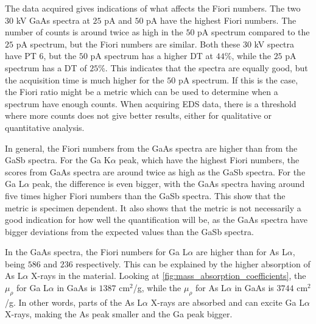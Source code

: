 The data acquired gives indications of what affects the Fiori numbers.
The two $30$ kV GaAs spectra at $25$ pA and $50$ pA have the highest Fiori numbers.
The number of counts is around twice as high in the $50$ pA spectrum compared to the $25$ pA spectrum, but the Fiori numbers are similar.
Both these $30$ kV spectra have PT $6$, but the $50$ pA spectrum has a higher DT at $44$\%, while the $25$ pA spectrum has a DT of $25$\%.
This indicates that the spectra are equally good, but the acquisition time is much higher for the $50$ pA spectrum.
If this is the case, the Fiori ratio might be a metric which can be used to determine when a spectrum have enough counts.
When acquiring EDS data, there is a threshold where more counts does not give better results, either for qualitative or quantitative analysis.


In general, the Fiori numbers from the GaAs spectra are higher than from the GaSb spectra.
For the Ga K$\alpha$ peak, which have the highest Fiori numbers, the scores from GaAs spectra are around twice as high as the GaSb spectra.
For the Ga L$\alpha$ peak, the difference is even bigger, with the GaAs spectra having around five times higher Fiori numbers than the GaSb spectra.
This show that the metric is specimen dependent.
It also shows that the metric is not necessarily a good indication for how well the quantification will be, as the GaAs spectra have bigger deviations from the expected values than the GaSb spectra.



In the GaAs spectra, the Fiori numbers for Ga L$\alpha$ are higher than for As L$\alpha$, being $586$ and $236$ respectively.
This can be explained by the higher absorption of As L$\alpha$ X-rays in the material.
Looking at \cref{fig:mass_absorption_coefficients}, the $\mu_\rho$ for Ga L$\alpha$ in GaAs is $1387$ cm$^2$/g, while the $\mu_\rho$ for As L$\alpha$ in GaAs is $3744$ cm$^2$/g.
In other words, parts of the As L$\alpha$ X-rays are absorbed and can excite Ga L$\alpha$ X-rays, making the As peak smaller and the Ga peak bigger.


